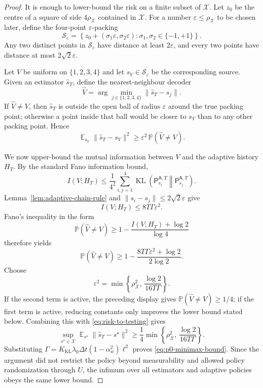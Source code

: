 \documentclass[11pt]{article}
\DeclareMathOperator{\E}{\mathbb{E}}
\DeclareMathOperator{\KL}{\mathrm{KL}}
\newcommand{\X}{\mathcal{X}}
\newcommand{\dt}{\Delta t}
\newcommand{\law}{\mathsf{P}}
\begin{document}
\begin{proof}
It is enough to lower-bound the risk on a finite subset of $\X$.  Let $z_0$ be the centre of a square of side $4\rho_{\X}$ contained in $\X$.  For a number $\varepsilon\leq \rho_{\X}$ to be chosen later, define the four-point $\varepsilon$-packing
\[
        \mathcal{S}_{\varepsilon}
        =
        \left\{
        z_0+(\sigma_1\varepsilon,\sigma_2\varepsilon):
        \sigma_1,\sigma_2\in\{-1,+1\}
        \right\}.
\]
Any two distinct points in $\mathcal{S}_{\varepsilon}$ have distance at least $2\varepsilon$, and every two points have distance at most $2\sqrt{2}\varepsilon$.

Let $V$ be uniform on $\{1,2,3,4\}$ and let $s_V\in\mathcal{S}_{\varepsilon}$ be the corresponding source.  Given an estimator $\widehat{s}_T$, define the nearest-neighbour decoder
\[
        \widehat{V}
        =
        \arg\min_{j\in\{1,2,3,4\}}
        \|\widehat{s}_T-s_j\|.
\]
If $\widehat{V}\neq V$, then $\widehat{s}_T$ is outside the open ball of radius $\varepsilon$ around the true packing point; otherwise a point inside that ball would be closer to $s_V$ than to any other packing point.  Hence
\begin{equation}
        \E_{s_V}\|\widehat{s}_T-s_V\|^2
        \geq
        \varepsilon^2\,\mathbb{P}(\widehat{V}\neq V).
        \label{eq:risk-to-testing}
\end{equation}

We now upper-bound the mutual information between $V$ and the adaptive history $H_T$.  By the standard Fano information bound,
\[
        I(V;H_T)
        \leq
        \frac{1}{4^2}\sum_{i,j=1}^4
        \KL\!\left(\law_{s_i}^{\mathsf{A},T}\middle\|\law_{s_j}^{\mathsf{A},T}\right).
\]
Lemma~\ref{lem:adaptive-chain-rule} and $\|s_i-s_j\|\leq 2\sqrt{2}\varepsilon$ give
\begin{equation}
        I(V;H_T)\leq 8T\Gamma\varepsilon^2.
        \label{eq:mutual-info-upper}
\end{equation}
Fano's inequality in the form
\[
        \mathbb{P}(\widehat{V}\neq V)
        \geq
        1-\frac{I(V;H_T)+\log 2}{\log 4}
\]
therefore yields
\[
        \mathbb{P}(\widehat{V}\neq V)
        \geq
        1-\frac{8T\Gamma\varepsilon^2+\log 2}{2\log 2}.
\]
Choose
\[
        \varepsilon^2
        =
        \min\!\left\{
        \rho_{\X}^2,\,
        \frac{\log 2}{16T\Gamma}
        \right\}.
\]
If the second term is active, the preceding display gives
$\mathbb{P}(\widehat{V}\neq V)\geq 1/4$; if the first term is active, reducing constants only improves the lower bound stated below.  Combining this with \eqref{eq:risk-to-testing} gives
\[
        \sup_{s^\star\in\X}\E_{s^\star}\|\widehat{s}_T-s^\star\|^2
        \geq
        \frac{1}{4}
        \min\!\left\{
        \rho_{\X}^2,\,
        \frac{\log 2}{16T\Gamma}
        \right\}.
\]
Substituting $\Gamma=K_{\mathrm{KL}}\lambda_0\dt(1-\alpha_w^2)\ell^2$ proves \eqref{eq:p0-minimax-bound}.  Since the argument did not restrict the policy beyond measurability and allowed policy randomization through $U$, the infimum over all estimators and adaptive policies obeys the same lower bound.
\end{proof}
\end{document}
